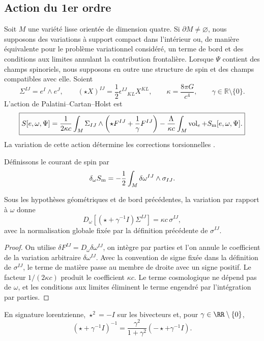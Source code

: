 \subsection{Action du 1er ordre}

Soit \(M\) une variété lisse orientée de dimension quatre. Si \(\partial M\ne\varnothing\), nous supposons des variations à support compact dans l’intérieur ou, de manière équivalente pour le problème variationnel considéré, un terme de bord et des conditions aux limites annulant la contribution frontalière. Lorsque \(\Psi\) contient des champs spinoriels, nous supposons en outre une structure de spin et des champs compatibles avec elle. Soient
\[
 \Sigma^{IJ}=e^I\wedge e^J,
 \qquad
 (\star X)^{IJ}=\frac12\epsilon^{IJ}{}_{KL}X^{KL},
 \qquad
 \kappa=\frac{8\pi G}{c^4},
 \qquad
 \gamma\in\mathbb R\setminus\{0\}.
\]
L’action de Palatini--Cartan--Holst est
\[
\boxed{
 S[e,\omega,\Psi]
 =\frac1{2\kappa c}\int_M
 \Sigma_{IJ}\wedge\left(\star F^{IJ}+\frac1\gamma F^{IJ}\right)
 -\frac\Lambda{\kappa c}\int_M\operatorname{vol}_e
 +S_{\rm m}[e,\omega,\Psi].}
\]
La variation de cette action détermine les corrections torsionnelles \cite{Sciama1964,Kibble1961,Hehl1976,Holst1996}.

Définissons le courant de spin par
\[
 \delta_\omega S_{\rm m}
 =-\frac12\int_M\delta\omega^{IJ}\wedge\sigma_{IJ}.
\]

\begin{theorem}
Sous les hypothèses géométriques et de bord précédentes, la variation par rapport à \(\omega\) donne
\[
 D_\omega\!\left[(\star+\gamma^{-1}I)\Sigma^{IJ}\right]
 =\kappa c\,\sigma^{IJ},
\]
avec la normalisation globale fixée par la définition précédente de \(\sigma^{IJ}\).
\end{theorem}
\begin{proof}
On utilise \(\delta F^{IJ}=D_\omega\delta\omega^{IJ}\), on intègre par parties et l’on annule le coefficient de la variation arbitraire \(\delta\omega^{IJ}\). Avec la convention de signe fixée dans la définition de \(\sigma^{IJ}\), le terme de matière passe au membre de droite avec un signe positif. Le facteur \(1/(2\kappa c)\) produit le coefficient \(\kappa c\). Le terme cosmologique ne dépend pas de \(\omega\), et les conditions aux limites éliminent le terme engendré par l’intégration par parties.
\end{proof}

En signature lorentzienne, \(\star^2=-I\) sur les bivecteurs et, pour \(\gamma\in\RR\setminus\{0\}\),
\[
 (\star+\gamma^{-1}I)^{-1}
 =\frac{\gamma^2}{1+\gamma^2}(-\star+\gamma^{-1}I).
\]

